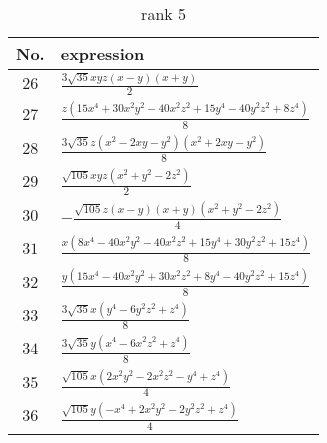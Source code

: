 \documentclass[fleqn,8pt,landscape]{jsarticle}
\begin{document}
\begin{table}[ht!]
\begin{center}
\caption{rank 5}
\renewcommand{\arraystretch}{1.3}
\begin{tabular}{cl} \hline \hline
No. & expression \\ \hline
$ 26 $ & $ \frac{3 \sqrt{35} x y z \left(x - y\right) \left(x + y\right)}{2} $ \\
$ 27 $ & $ \frac{z \left(15 x^{4} + 30 x^{2} y^{2} - 40 x^{2} z^{2} + 15 y^{4} - 40 y^{2} z^{2} + 8 z^{4}\right)}{8} $ \\
$ 28 $ & $ \frac{3 \sqrt{35} z \left(x^{2} - 2 x y - y^{2}\right) \left(x^{2} + 2 x y - y^{2}\right)}{8} $ \\
$ 29 $ & $ \frac{\sqrt{105} x y z \left(x^{2} + y^{2} - 2 z^{2}\right)}{2} $ \\
$ 30 $ & $ - \frac{\sqrt{105} z \left(x - y\right) \left(x + y\right) \left(x^{2} + y^{2} - 2 z^{2}\right)}{4} $ \\
$ 31 $ & $ \frac{x \left(8 x^{4} - 40 x^{2} y^{2} - 40 x^{2} z^{2} + 15 y^{4} + 30 y^{2} z^{2} + 15 z^{4}\right)}{8} $ \\
$ 32 $ & $ \frac{y \left(15 x^{4} - 40 x^{2} y^{2} + 30 x^{2} z^{2} + 8 y^{4} - 40 y^{2} z^{2} + 15 z^{4}\right)}{8} $ \\
$ 33 $ & $ \frac{3 \sqrt{35} x \left(y^{4} - 6 y^{2} z^{2} + z^{4}\right)}{8} $ \\
$ 34 $ & $ \frac{3 \sqrt{35} y \left(x^{4} - 6 x^{2} z^{2} + z^{4}\right)}{8} $ \\
$ 35 $ & $ \frac{\sqrt{105} x \left(2 x^{2} y^{2} - 2 x^{2} z^{2} - y^{4} + z^{4}\right)}{4} $ \\
$ 36 $ & $ \frac{\sqrt{105} y \left(- x^{4} + 2 x^{2} y^{2} - 2 y^{2} z^{2} + z^{4}\right)}{4} $ \\
 \hline \hline
\end{tabular}
\end{center}
\end{table}
\end{document}
